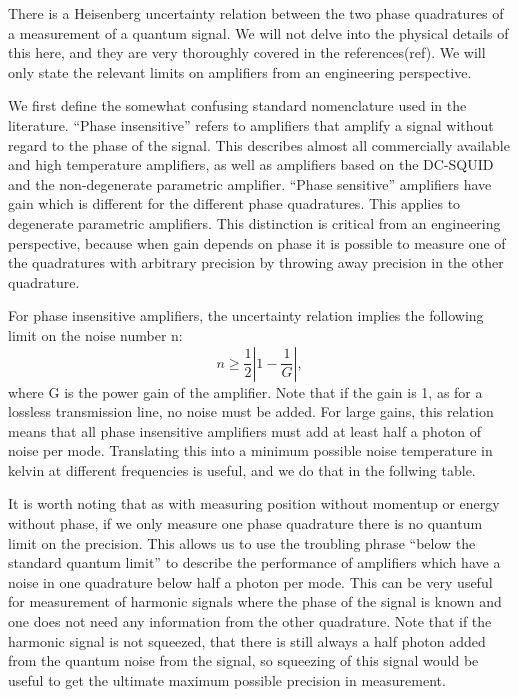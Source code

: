 \documentclass[11pt]{article}
\begin{document}
    	There is a Heisenberg uncertainty relation between the two phase quadratures of a measurement of a quantum signal. We will not delve into the physical details of this here, and they are very thoroughly covered in the references(ref).  We will only state the relevant limits on amplifiers from an engineering perspective.  




    	We first define the somewhat confusing standard nomenclature used in the literature.  ``Phase insensitive'' refers to amplifiers that amplify a signal without regard to the phase of the signal.  This describes almost all commercially available and high temperature amplifiers, as well as amplifiers based on the DC-SQUID and the non-degenerate parametric amplifier.  ``Phase sensitive'' amplifiers have gain which is different for the different phase quadratures.  This applies to degenerate parametric amplifiers.  This distinction is critical from an engineering perspective, because when gain depends on phase it is possible to measure one of the quadratures with arbitrary precision by throwing away precision in the other quadrature.  




    	For phase insensitive amplifiers, the uncertainty relation implies the following limit on the noise number n:
$$n\geq \frac{1}{2}\left|1 - \frac{1}{G}\right|,$$
where G is the power gain of the amplifier.  Note that if the gain is 1, as for a lossless transmission line, no noise must be added.  For large gains, this relation means that all phase insensitive amplifiers must add at least half a photon of noise per mode.  Translating this into a minimum possible noise temperature in kelvin at different frequencies is useful, and we do that in the follwing table.  





    It is worth noting that as with measuring position without momentup or energy without phase, if we only measure one phase quadrature there is no quantum limit on the precision.  This allows us to use the troubling phrase ``below the standard quantum limit'' to describe the performance of amplifiers which have a noise in one quadrature below half a photon per mode.  This can be very useful for measurement of harmonic signals where the phase of the signal is known and one does not need any information from the other quadrature.  Note that if the harmonic signal is not squeezed, that there is still always a half photon added from the quantum noise from the signal, so squeezing of this signal would be useful to get the ultimate maximum possible precision in measurement.  
\end{document}
